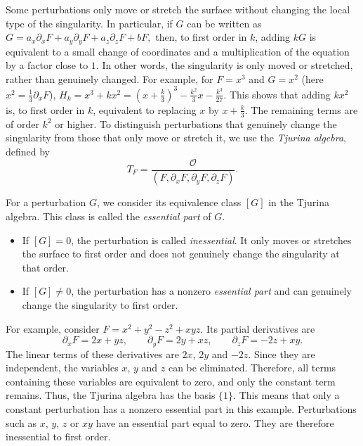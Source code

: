 \documentclass[12pt, a4paper]{article}
\theoremstyle{plain}
\theoremstyle{definition}
\theoremstyle{remark}
\theoremstyle{definition}
\begin{document}
Some perturbations only move or stretch the surface without changing the local type of the singularity.
In particular, if $G$ can be written as $G=a_x\partial_xF+a_y\partial_yF+a_z\partial_zF+bF,$
then, to first order in $k$, adding $kG$ is equivalent to a small change of coordinates and a multiplication of the equation by a factor close to $1$. 
In other words, the singularity is only moved or stretched, rather than genuinely changed.
For example, for $F=x^3$ and $G=x^2$ (here $x^2=\tfrac13\partial_xF$),
$H_k=x^3+kx^2 = \left(x+\frac{k}{3}\right)^3 -\frac{k^2}{3}x-\frac{k^3}{27}.$
This shows that adding $kx^2$ is, to first order in $k$, equivalent to replacing $x$ by $x+\frac{k}{3}$. 
The remaining terms are of order $k^2$ or higher.
To distinguish perturbations that genuinely change the singularity from those that only move or stretch it, we use the \emph{Tjurina algebra}, defined by
\[ T_F= \frac{\mathcal O} {(F,\partial_xF,\partial_yF,\partial_zF)}.\]

For a perturbation $G$, we consider its equivalence class $[G]$ in the Tjurina algebra. 
This class is called the
\emph{essential part} of $G$.
\begin{itemize}
    \item If $[G]=0$, the perturbation is called
    \emph{inessential}. It only moves or stretches the surface to first order and does not genuinely change the singularity at that order.
    \item If $[G]\neq 0$, the perturbation has a nonzero
    \emph{essential part} and can genuinely change the singularity to first order.
\end{itemize}

For example, consider $F=x^2+y^2-z^2+xyz.$
Its partial derivatives are \[ \partial_xF=2x+yz,\qquad \partial_yF=2y+xz,\qquad\partial_zF=-2z+xy.\]
The linear terms of these derivatives are $2x$, $2y$ and $-2z$.
Since they are independent, the variables $x$, $y$ and $z$ can be eliminated.
Therefore, all terms containing these variables are equivalent to zero, and only the constant term remains.
Thus, the Tjurina algebra has the basis $\{1\}.$
This means that only a constant perturbation has a nonzero essential part in this example. 
Perturbations such as $x$, $y$, $z$ or $xy$ have an essential part equal to zero. 
They are therefore inessential to first order.
\end{document}
